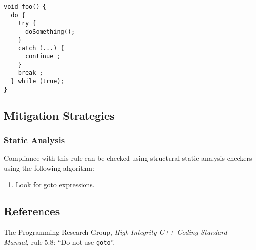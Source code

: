 
\begin{verbatim}
void foo() {
  do {
    try {
      doSomething();
    }
    catch (...) {
      continue ;
    }
    break ;
  } while (true);
}
\end{verbatim}

\subsection{Mitigation Strategies}
\subsubsection{Static Analysis}

Compliance with this rule can be checked using structural static
analysis checkers using the following algorithm:

\begin{enumerate}
\item Look for goto expressions.
\end{enumerate}

\subsection{References}

The Programming Research Group, \emph{High-Integrity C++ Coding
Standard Manual}, rule 5.8: ``Do not use \texttt{goto}''.
